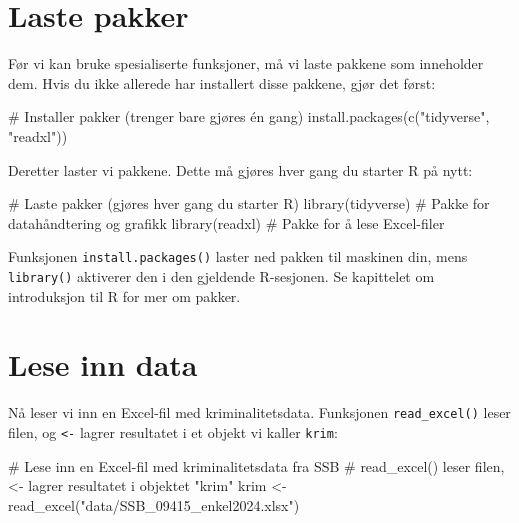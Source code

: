 \documentclass[
  norsk,
  letterpaper,
  DIV=11,
  numbers=noendperiod]{scrreprt}
\newenvironment{Shaded}{\begin{snugshade}}{\end{snugshade}}
\newcommand{\CommentTok}[1]{\textcolor[rgb]{0.37,0.37,0.37}{#1}}
\newcommand{\FunctionTok}[1]{\textcolor[rgb]{0.28,0.35,0.67}{#1}}
\newcommand{\NormalTok}[1]{\textcolor[rgb]{0.00,0.23,0.31}{#1}}
\newcommand{\OtherTok}[1]{\textcolor[rgb]{0.00,0.23,0.31}{#1}}
\newcommand{\StringTok}[1]{\textcolor[rgb]{0.13,0.47,0.30}{#1}}
\theoremstyle{definition}
\theoremstyle{remark}
\begin{document}
\section{Laste pakker}\label{laste-pakker}

Før vi kan bruke spesialiserte funksjoner, må vi laste pakkene som
inneholder dem. Hvis du ikke allerede har installert disse pakkene, gjør
det først:

\begin{Shaded}
\begin{Highlighting}[]
\CommentTok{\# Installer pakker (trenger bare gjøres én gang)}
\FunctionTok{install.packages}\NormalTok{(}\FunctionTok{c}\NormalTok{(}\StringTok{"tidyverse"}\NormalTok{, }\StringTok{"readxl"}\NormalTok{))}
\end{Highlighting}
\end{Shaded}

Deretter laster vi pakkene. Dette må gjøres hver gang du starter R på
nytt:

\begin{Shaded}
\begin{Highlighting}[]
\CommentTok{\# Laste pakker (gjøres hver gang du starter R)}
\FunctionTok{library}\NormalTok{(tidyverse)   }\CommentTok{\# Pakke for datahåndtering og grafikk}
\FunctionTok{library}\NormalTok{(readxl)      }\CommentTok{\# Pakke for å lese Excel{-}filer}
\end{Highlighting}
\end{Shaded}

Funksjonen \texttt{install.packages()} laster ned pakken til maskinen
din, mens \texttt{library()} aktiverer den i den gjeldende R-sesjonen.
Se kapittelet om introduksjon til R for mer om pakker.

\section{Lese inn data}\label{lese-inn-data}

Nå leser vi inn en Excel-fil med kriminalitetsdata. Funksjonen
\texttt{read\_excel()} leser filen, og \texttt{\textless{}-} lagrer
resultatet i et objekt vi kaller \texttt{krim}:

\begin{Shaded}
\begin{Highlighting}[]
\CommentTok{\# Lese inn en Excel{-}fil med kriminalitetsdata fra SSB}
\CommentTok{\# read\_excel() leser filen, \textless{}{-} lagrer resultatet i objektet "krim"}
\NormalTok{krim }\OtherTok{\textless{}{-}} \FunctionTok{read\_excel}\NormalTok{(}\StringTok{"data/SSB\_09415\_enkel2024.xlsx"}\NormalTok{)}
\end{Highlighting}
\end{Shaded}
\end{document}
